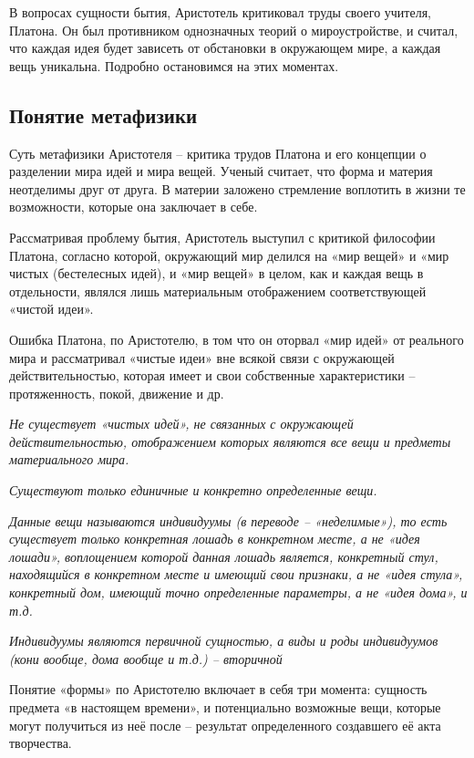 \documentclass[
]{article}
\begin{document}
В вопросах сущности бытия, Аристотель критиковал труды своего учителя,
Платона. Он был противником однозначных теорий о мироустройстве, и
считал, что каждая идея будет зависеть от обстановки в окружающем мире,
а каждая вещь уникальна. Подробно остановимся на этих моментах.

\hypertarget{ux43fux43eux43dux44fux442ux438ux435-ux43cux435ux442ux430ux444ux438ux437ux438ux43aux438}{%
\subsection{Понятие
метафизики}\label{ux43fux43eux43dux44fux442ux438ux435-ux43cux435ux442ux430ux444ux438ux437ux438ux43aux438}}

Суть метафизики Аристотеля -- критика трудов Платона и его концепции о
разделении мира идей и мира вещей. Ученый считает, что форма и материя
неотделимы друг от друга. В материи заложено стремление воплотить в
жизни те возможности, которые она заключает в себе.

Рассматривая проблему бытия, Аристотель выступил с критикой философии
Платона, согласно которой, окружающий мир делился на «мир вещей» и «мир
чистых (бестелесных идей), и «мир вещей» в целом, как и каждая вещь в
отдельности, являлся лишь материальным отображением соответствующей
«чистой идеи».

Ошибка Платона, по Аристотелю, в том что он оторвал «мир идей» от
реального мира и рассматривал «чистые идеи» вне всякой связи с
окружающей действительностью, которая имеет и свои собственные
характеристики -- протяженность, покой, движение и др.

\emph{Не существует «чистых идей», не связанных с окружающей
действительностью, отображением которых являются все вещи и предметы
материального мира.}

\emph{Существуют только единичные и конкретно определенные вещи.}

\emph{Данные вещи называются индивидуумы (в переводе -- «неделимые»), то
есть существует только конкретная лошадь в конкретном месте, а не «идея
лошади», воплощением которой данная лошадь является, конкретный стул,
находящийся в конкретном месте и имеющий свои признаки, а не «идея
стула», конкретный дом, имеющий точно определенные параметры, а не «идея
дома», и т.д.}

\emph{Индивидуумы являются первичной сущностью, а виды и роды
индивидуумов (кони вообще, дома вообще и т.д.) -- вторичной}

Понятие «формы» по Аристотелю включает в себя три момента: сущность
предмета «в настоящем времени», и потенциально возможные вещи, которые
могут получиться из неё после -- результат определенного создавшего её
акта творчества.
\end{document}
